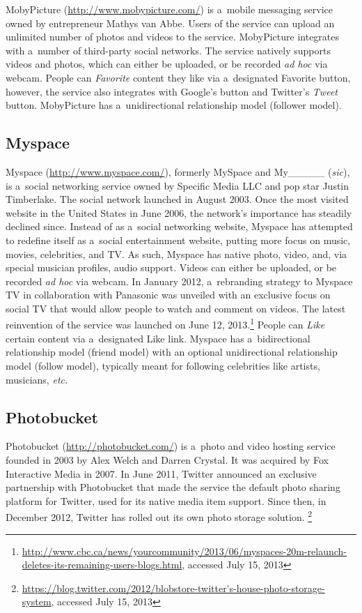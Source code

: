 MobyPicture (\url{http://www.mobypicture.com/})
is a~mobile messaging service
owned by entrepreneur Mathys van Abbe.
Users of the service can upload an unlimited number of
photos and videos to the service.
MobyPicture integrates with a~number of
third-party social networks.
The service natively supports videos and photos,
which can either be uploaded, or be recorded \emph{ad hoc}
via webcam.
People can \emph{Favorite} content they like via
a~designated Favorite button,
however, the service also integrates with Google's
\emph{\plusone} button and Twitter's \emph{Tweet} button.
MobyPicture has a~unidirectional relationship model
(follower model).

\subsection{Myspace}

Myspace (\url{http://www.myspace.com/}),
formerly MySpace and My\_\_\_\_\_ (\emph{sic}), is
a~social networking service owned by Specific Media LLC
and pop star Justin Timberlake.
The social network launched in August 2003.
Once the most visited website
in the United States in June 2006,
the network's importance has steadily declined since.
Instead of as a~social networking website,
Myspace has attempted to redefine itself
as a~social entertainment website,
putting more focus on music, movies, celebrities, and TV.
As such, Myspace has native photo, video, and,
via special musician profiles, audio support.
Videos can either be uploaded,
or be recorded \emph{ad hoc} via webcam.
In January 2012, a~rebranding strategy to Myspace TV
in collaboration with Panasonic was unveiled
with an exclusive focus on social TV that would allow people
to watch and comment on videos.
The latest reinvention of the service was launched on June 12, 2013.\footnote{\url{http://www.cbc.ca/news/yourcommunity/2013/06/myspaces-20m-relaunch-deletes-its-remaining-users-blogs.html},
accessed July 15, 2013}
People can \emph{Like} certain content via a~designated Like link.
Myspace has a~bidirectional relationship model (friend model)
with an optional unidirectional relationship model (follow model),
typically meant for following celebrities like artists,
musicians, \emph{etc.}

\subsection{Photobucket}

Photobucket (\url{http://photobucket.com/})
is a~photo and video hosting service
founded in 2003 by Alex Welch and Darren Crystal.
It was acquired by Fox Interactive Media in 2007.
In June 2011, Twitter announced an exclusive partnership
with Photobucket that made the service
the default photo sharing platform for Twitter,
used for its native media item support.
Since then, in December 2012,
Twitter has rolled out its own photo storage solution.%
\footnote{\url{https://blog.twitter.com/2012/blobstore-twitter's-house-photo-storage-system}, accessed July 15, 2013}

